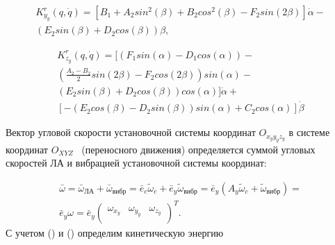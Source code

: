 \begin{equation}
\begin{multlined}
 K_{y_{y}}^{r} \left( q,\dot{q} \right) = 
 [ B_{1}+A_{2}sin^{2} (  \beta  ) +B_{2}cos^{2} (  \beta  ) -F_{2}sin ( 2 \beta  )  ]  \dot{\alpha} - \nonumber \\
 ( E_{2}sin (  \beta  ) +D_{2}cos (  \beta  )  )  \beta  ,  \nonumber
\end{multlined}
\end{equation}

\begin{equation}
\begin{multlined}
K_{z_{y}}^{r} \left( q,\dot{q} \right) = 
[  
	\left( F_{1}sin (  \alpha  ) -D_{1}cos (  \alpha  )  \right) -  \nonumber \\
	\left( \frac{A_{2}-B_{2}}{2}sin ( 2 \beta  ) -F_{2}cos ( 2 \beta  )  \right) sin (  \alpha  ) - \nonumber \\
	\left( E_{2}sin (  \beta  ) +D_{2}cos (  \beta  )  \right) cos (  \alpha  )
]
\dot{\alpha} + \nonumber \\
[ 
	- \left( E_{2}cos (  \beta  ) -D_{2}sin (  \beta  )  \right) sin (  \alpha  ) +C_{2}cos (  \alpha  )  
]  
\dot{\beta}  \nonumber
\end{multlined}
\end{equation}

Вектор угловой скорости установочной системы координат  \( O_{x_{y}y_{y}z_{y}} \)  в системе координат  \( O_{XYZ} \) \ (переносного движения) определяется суммой угловых скоростей ЛА  и вибрацией установочной системы координат:\par






\begin{equation} %
\label{eq:p3:16}
\begin{multlined}
\bar{\omega} = 
\bar{\omega}_{\textit{ЛА}}+ \bar{\omega}_{\textit{вибр}}=
\bar{e}_{c} \tilde{\omega}_{c}+\bar{e}_{\textit{y}} \tilde{\omega}_{\textit{вибр}}=
\bar{e}_{y} \left( A_{y} \tilde{\omega}_{c}+ \tilde{\omega}_{\textit{вибр}} \right) = \\
\bar{e}_{y} \omega =\bar{e}_{y} \left( \begin{matrix}
\omega_{x_{y}}  &   \omega_{y_{y}}  &   \omega_{z_{y}}\\
\end{matrix}
\right) ^{T}.
\end{multlined}
\end{equation}
С учетом () и () определим кинетическую энергию\par


